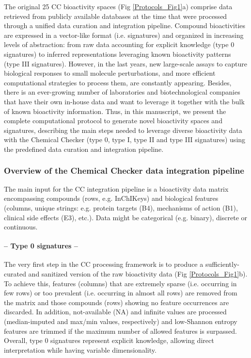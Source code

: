 The original 25 CC bioactivity spaces (Fig \ref{Protocols_Fig1}a) comprise data retrieved from publicly available databases at the time that were processed through a unified data curation and integration pipeline. Compound bioactivities are expressed in a vector-like format (i.e. signatures) and organized in increasing levels of abstraction: from raw data accounting for explicit knowledge (type 0 signatures) to inferred representations leveraging known bioactivity patterns (type III signatures). However, in the last years, new large-scale assays to capture biological responses to small molecule perturbations, and more efficient computational strategies to process them, are constantly appearing\cite{anglada-girotto_combining_2022, mitchell_proteome-wide_2023, offensperger_large-scale_2024}. Besides, there is an ever-growing number of laboratories and biotechnological companies that have their own in-house data and want to leverage it together with the bulk of known bioactivity information. Thus, in this manuscript, we present the complete computational protocol to generate novel bioactivity spaces and signatures, describing the main steps needed to leverage diverse bioactivity data with the Chemical Checker (type 0, type I, type II and type III signatures) using the predefined data curation and integration pipeline.

\subsubsection{Overview of the Chemical Checker data integration pipeline}
\label{Overview of the Chemical Checker data integration pipeline}

The main input for the CC integration pipeline is a bioactivity data matrix encompassing compounds (rows, e.g. InChIKeys) and biological features (columns, unique strings: e.g. protein targets (B4), mechanisms of action (B1), clinical side effects (E3), etc.). Data might be categorical (e.g. binary), discrete or continuous.

\paragraph{-- Type 0 signatures --} \leavevmode

The very first step in the CC processing framework is to produce a sufficiently-curated and sanitized version of the raw bioactivity data (Fig \ref{Protocols_Fig1}b). To achieve this, features (columns) that are extremely sparse (i.e. occurring in few rows) or too prevalent (i.e. occurring in almost all rows) are removed from the matrix and those compounds (rows) showing no feature occurrences are discarded. In addition, not-available (NA) and infinite values are processed (median-imputed and max/min values, respectively) and low-Shannon entropy features are trimmed if the maximum number of allowed features is surpassed. Overall, type 0 signatures represent explicit knowledge, allowing direct interpretation while having variable dimensionality. 

